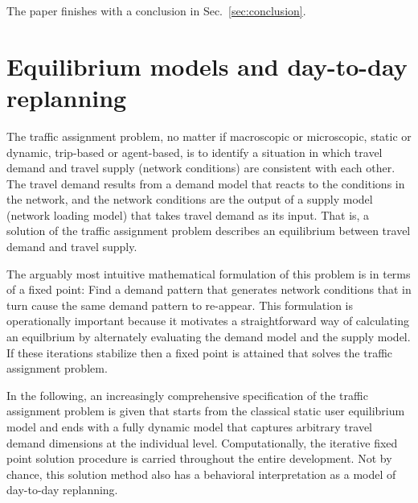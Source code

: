 The paper finishes with a conclusion in Sec.~\ref{sec:conclusion}.






\section{Equilibrium models and day-to-day replanning}
\label{sec:equil-models-day}

The traffic assignment problem, no matter if macroscopic or
microscopic, static or dynamic, trip-based or agent-based, is to
identify a situation in which travel demand and travel supply (network
conditions) are consistent with each other. The travel demand results
from a demand model that reacts to the conditions in the network, and
the network conditions are the output of a supply model
(network loading model) that takes travel demand as its input. That
is, a solution of the traffic assignment problem describes an 
equilibrium between travel demand and travel supply.

The arguably most intuitive mathematical formulation of this problem is in terms of a fixed point: Find a demand pattern that generates network conditions that in turn cause the same demand pattern to re-appear. This formulation is operationally important because it motivates a straightforward way of calculating an equilbrium by alternately evaluating the demand model and the supply model. If these iterations stabilize then a fixed point is attained that solves the traffic assignment problem.

In the following, an increasingly comprehensive specification of the traffic assignment problem is given that starts from the classical static user equilibrium model and ends with a fully dynamic model that captures arbitrary travel demand dimensions at the individual level. Computationally, the iterative fixed point solution procedure is carried throughout the entire development. Not by chance, this solution method also has a behavioral interpretation as a model of day-to-day replanning.

